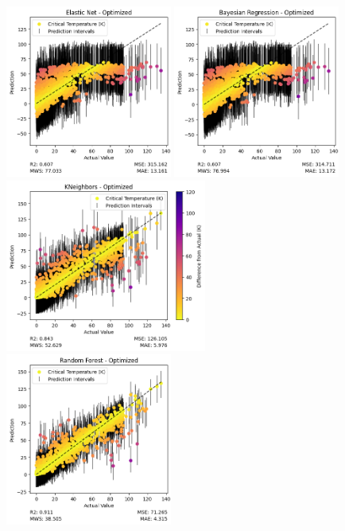 \documentclass[twocolumn, nofootinbib, secnumarabic, amssymb, nobibnotes, aps, prd]{revtex4-2}
\begin{document}
\begin{figure}[!h]
    \centering
    \includegraphics[height=2.23in]{images/subfigures/uncertainty/elastic_net_optimized.png}
    \includegraphics[height=2.23in]{images/subfigures/uncertainty/bayesian_regression_optimized.png}
    \includegraphics[height=2.23in]{images/subfigures/uncertainty/kneighbors_optimized.png}
    \includegraphics[height=2.23in]{images/subfigures/uncertainty/random_forest_optimized.png}

\end{figure}
\end{document}

